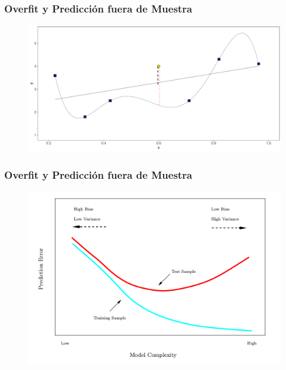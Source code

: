 \documentclass[
  shownotes,
  xcolor={svgnames},
  hyperref={colorlinks,citecolor=DarkBlue,linkcolor=andesred,urlcolor=DarkBlue}
  , aspectratio=169]{beamer}
\begin{document}
\begin{frame}
\frametitle{Overfit y Predicción fuera de Muestra}


        \begin{figure}[H] \centering
            \captionsetup{justification=centering}
              \includegraphics[scale=0.4]{figures/fig_all_sample_polys_erors_all.pdf}
 \end{figure}


\end{frame}
\begin{frame}
\frametitle{Overfit y Predicción fuera de Muestra}



\begin{figure}[H] \centering
            \captionsetup{justification=centering}  
            \includegraphics[scale=.6]{figures/train_test_error.png}
    \end{figure}

\end{frame}
\end{document}
